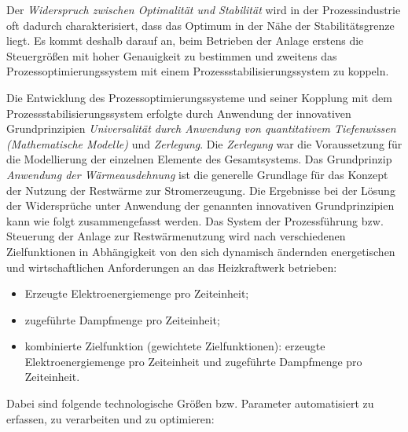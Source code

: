 \documentclass[11pt,a4paper]{article}
\begin{document}
Der \emph{Widerspruch zwischen Optimalität und Stabilität} wird in der
Prozessindustrie oft dadurch charakterisiert, dass das Optimum in der Nähe der
Stabilitätsgrenze liegt. Es kommt deshalb darauf an, beim Betrieben der Anlage
erstens die Steuergrößen mit hoher Genauigkeit zu bestimmen und zweitens das
Prozessoptimierungssystem mit einem Prozessstabilisierungssystem zu koppeln.

Die Entwicklung des Prozessoptimierungssysteme und seiner Kopplung mit dem
Prozessstabilisierungssystem erfolgte durch Anwendung der innovativen
Grundprinzipien \emph{Universalität durch Anwendung von quantitativem
  Tiefenwissen (Mathematische Modelle)} und \emph{Zerlegung}. Die
\emph{Zerlegung} war die Voraussetzung für die Modellierung der einzelnen
Elemente des Gesamtsystems.  Das Grundprinzip \emph{Anwendung der
  Wärmeausdehnung} ist die generelle Grundlage für das Konzept der Nutzung der
Restwärme zur Stromerzeugung. Die Ergebnisse bei der Lösung der Widersprüche
unter Anwendung der genannten innovativen Grundprinzipien kann wie folgt
zusammengefasst werden. Das System der Prozessführung bzw. Steuerung der Anlage
zur Restwärmenutzung wird nach verschiedenen Zielfunktionen in Abhängigkeit von
den sich dynamisch ändernden energetischen und wirtschaftlichen Anforderungen
an das Heizkraftwerk betrieben:
\begin{itemize}
\item Erzeugte Elektroenergiemenge pro Zeiteinheit;
\item zugeführte Dampfmenge pro Zeiteinheit;
\item kombinierte Zielfunktion (gewichtete Zielfunktionen): erzeugte
  Elektroenergiemenge pro Zeiteinheit und zugeführte Dampfmenge pro
  Zeiteinheit.
\end{itemize}
Dabei sind folgende technologische Größen bzw. Parameter automatisiert zu
erfassen, zu verarbeiten und zu optimieren:
\end{document}
